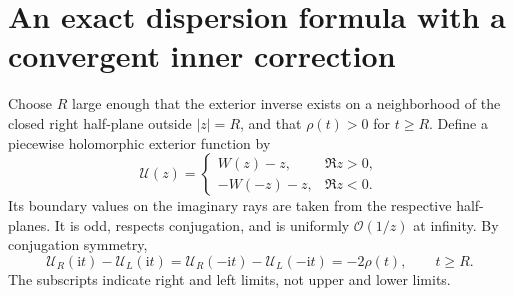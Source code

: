 \documentclass[11pt,a4paper]{article}
\theoremstyle{definition}
\numberwithin{equation}{section}
\newcommand{\ii}{\mathrm{i}}
\newcommand{\Oh}{\mathcal O}
\newcommand{\U}{\mathcal U}
\begin{document}
\section{An exact dispersion formula with a convergent inner correction}
\label{sec:spectral}

Choose $R$ large enough that the exterior inverse exists on a neighborhood of the closed right half-plane outside $|z|=R$, and that $\rho(t)>0$ for $t\ge R$. Define a piecewise holomorphic exterior function by
\begin{equation}
 \U(z)=
 \begin{cases}
 W(z)-z,&\Re z>0,\\
 -W(-z)-z,&\Re z<0.
 \end{cases}
 \label{eq:piecewise}
\end{equation}
Its boundary values on the imaginary rays are taken from the respective half-planes. It is odd, respects conjugation, and is uniformly $\Oh(1/z)$ at infinity. By conjugation symmetry,
\begin{equation}
 \U_R(\ii t)-\U_L(\ii t)
 =\U_R(-\ii t)-\U_L(-\ii t)=-2\rho(t),\qquad t\ge R.
 \label{eq:jump}
\end{equation}
The subscripts indicate right and left limits, not upper and lower limits.
\end{document}
